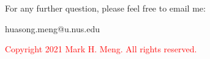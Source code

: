 \begin{frame}{}
	\centering  
	For any further question, please feel free to email me:\vspace{10pt}
	
	huasong.meng@u.nus.edu \vspace{20pt}
	
	\begin{tcolorbox}
		\begin{center}
			\textcolor{red}{Copyright 2021 Mark H. Meng. All rights reserved.}
		\end{center}
	\end{tcolorbox}
\end{frame}